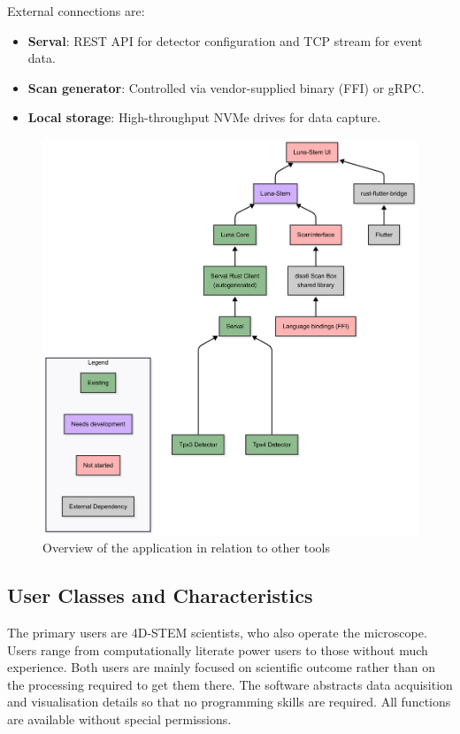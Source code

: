 \documentclass[12pt]{article}
\begin{document}
External connections are:
\begin{itemize}
    \item \textbf{Serval}: REST API for detector configuration and TCP stream for event data.
    \item \textbf{Scan generator}: Controlled via vendor-supplied binary (FFI) or gRPC.
    \item \textbf{Local storage}: High-throughput NVMe drives for data capture.
\end{itemize}

\begin{figure}[t]
    \centering
    \includegraphics[width=0.7\linewidth]{GeneralStructure}
    \caption{Overview of the application in relation to other tools}
    \label{fig:general_structure}
\end{figure}


\subsection{User Classes and Characteristics}\label{subsec:user-classes-and-characteristics}
The primary users are 4D-STEM scientists, who also operate the microscope. Users range from computationally literate power users to those without much experience. Both users are mainly focused on scientific outcome rather than on the processing required to get them there. The software abstracts data acquisition and visualisation details so that no programming skills are required. All functions are available without special permissions.
\end{document}
